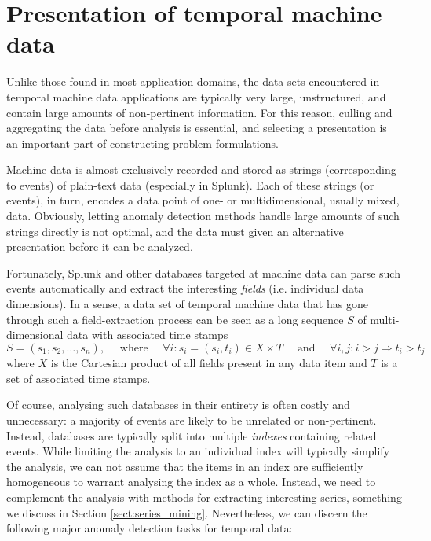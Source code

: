 \section{Presentation of temporal machine data}
\label{sect:splunk_techniques}

Unlike those found in most application domains, the data sets encountered in temporal machine data applications are typically very large, unstructured, and contain large amounts of non-pertinent information. For this reason, culling and aggregating the data before analysis is essential, and selecting a presentation is an important part of constructing problem formulations.

Machine data is almost exclusively recorded and stored as strings (corresponding to events) of plain-text data (especially in Splunk). Each of these strings (or events), in turn, encodes a data point of one- or multidimensional, usually mixed, data. Obviously, letting anomaly detection methods handle large amounts of such strings directly is not optimal, and the data must given an alternative presentation before it can be analyzed.

Fortunately, Splunk and other databases targeted at machine data can parse such events automatically and extract the interesting \emph{fields} (i.e. individual data dimensions). In a sense, a data set of temporal machine data that has gone through such a field-extraction process can be seen as a long sequence $S$ of multi-dimensional data with associated time stamps
\[
  S = (s_1, s_2, \dots, s_n), \quad \text{ where } \quad \forall i: s_i = (s_i, t_i) \in X \times T \quad \text{ and } \quad \forall i,j: i > j \Rightarrow t_i > t_j
\]
where $X$ is the Cartesian product of all fields present in any data item and $T$ is a set of associated time stamps.

Of course, analysing such databases in their entirety is often costly and unnecessary: a majority of events are likely to be unrelated or non-pertinent. Instead, databases are typically split into multiple \emph{indexes} containing related events. While limiting the analysis to an individual index will typically simplify the analysis, we can not assume that the items in an index are sufficiently homogeneous to warrant analysing the index as a whole. Instead, we need to complement the analysis with methods for extracting interesting series, something we discuss in Section \ref{sect:series_mining}. Nevertheless, we can discern the following major anomaly detection tasks for temporal data:

